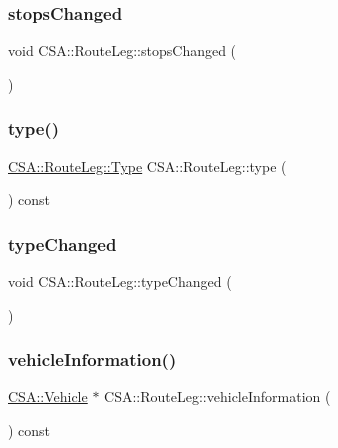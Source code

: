 \subsubsection{\texorpdfstring{stops\+Changed}{stopsChanged}}
{\footnotesize\ttfamily void C\+S\+A\+::\+Route\+Leg\+::stops\+Changed (\begin{DoxyParamCaption}{ }\end{DoxyParamCaption})\hspace{0.3cm}{\ttfamily [signal]}}

\mbox{\label{classCSA_1_1RouteLeg_abbea7d9d097dbf9b7c87543b2a2e8aac}} 
\subsubsection{\texorpdfstring{type()}{type()}}
{\footnotesize\ttfamily \mbox{\hyperlink{classCSA_1_1RouteLeg_a464547cf160a77a2014d101560b1f77b}{C\+S\+A\+::\+Route\+Leg\+::\+Type}} C\+S\+A\+::\+Route\+Leg\+::type (\begin{DoxyParamCaption}{ }\end{DoxyParamCaption}) const}

\mbox{\label{classCSA_1_1RouteLeg_a5ea5eef9f78700d451ddd2f0ad0ac208}} 
\subsubsection{\texorpdfstring{type\+Changed}{typeChanged}}
{\footnotesize\ttfamily void C\+S\+A\+::\+Route\+Leg\+::type\+Changed (\begin{DoxyParamCaption}{ }\end{DoxyParamCaption})\hspace{0.3cm}{\ttfamily [signal]}}

\mbox{\label{classCSA_1_1RouteLeg_a766608f69057a64427736f02de434654}} 
\subsubsection{\texorpdfstring{vehicle\+Information()}{vehicleInformation()}}
{\footnotesize\ttfamily \mbox{\hyperlink{classCSA_1_1Vehicle}{C\+S\+A\+::\+Vehicle}} $\ast$ C\+S\+A\+::\+Route\+Leg\+::vehicle\+Information (\begin{DoxyParamCaption}{ }\end{DoxyParamCaption}) const}

